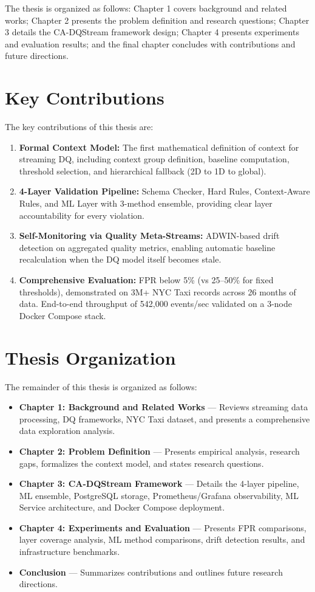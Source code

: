 \documentclass[a4paper, reqno, oneside]{book}
\begin{document}
The thesis is organized as follows: Chapter 1 covers background and related works; Chapter 2 presents the problem definition and research questions; Chapter 3 details the CA-DQStream framework design; Chapter 4 presents experiments and evaluation results; and the final chapter concludes with contributions and future directions.

\section{Key Contributions}
The key contributions of this thesis are:

\begin{enumerate}
    \item \textbf{Formal Context Model:} The first mathematical definition of context for streaming DQ, including context group definition, baseline computation, threshold selection, and hierarchical fallback (2D to 1D to global).
    \item \textbf{4-Layer Validation Pipeline:} Schema Checker, Hard Rules, Context-Aware Rules, and ML Layer with 3-method ensemble, providing clear layer accountability for every violation.
    \item \textbf{Self-Monitoring via Quality Meta-Streams:} ADWIN-based drift detection on aggregated quality metrics, enabling automatic baseline recalculation when the DQ model itself becomes stale.
    \item \textbf{Comprehensive Evaluation:} FPR below 5\% (vs 25--50\% for fixed thresholds), demonstrated on 3M+ NYC Taxi records across 26 months of data. End-to-end throughput of 542,000 events/sec validated on a 3-node Docker Compose stack.
\end{enumerate}

\section{Thesis Organization}
The remainder of this thesis is organized as follows:
\begin{itemize}
    \item \textbf{Chapter 1: Background and Related Works} --- Reviews streaming data processing, DQ frameworks, NYC Taxi dataset, and presents a comprehensive data exploration analysis.
    \item \textbf{Chapter 2: Problem Definition} --- Presents empirical analysis, research gaps, formalizes the context model, and states research questions.
    \item \textbf{Chapter 3: CA-DQStream Framework} --- Details the 4-layer pipeline, ML ensemble, PostgreSQL storage, Prometheus/Grafana observability, ML Service architecture, and Docker Compose deployment.
    \item \textbf{Chapter 4: Experiments and Evaluation} --- Presents FPR comparisons, layer coverage analysis, ML method comparisons, drift detection results, and infrastructure benchmarks.
    \item \textbf{Conclusion} --- Summarizes contributions and outlines future research directions.
\end{itemize}
\end{document}
